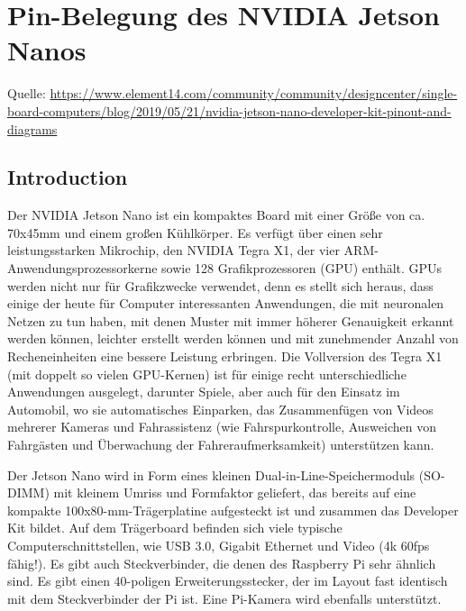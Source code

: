 %
%

\chapter{Pin-Belegung des NVIDIA Jetson Nanos}


{\tiny  Quelle: \url{https://www.element14.com/community/community/designcenter/single-board-computers/blog/2019/05/21/nvidia-jetson-nano-developer-kit-pinout-and-diagrams}}


\section{Introduction}



Der NVIDIA Jetson Nano ist ein kompaktes Board mit einer Größe von ca. 70x45mm und einem großen Kühlkörper. 
Es verfügt über einen sehr leistungsstarken Mikrochip, den NVIDIA Tegra X1, der vier ARM-Anwendungsprozessorkerne sowie 128 Grafikprozessoren (GPU) enthält. GPUs werden nicht nur für Grafikzwecke verwendet, denn es stellt sich heraus, dass einige der heute für Computer interessanten Anwendungen, die mit neuronalen Netzen zu tun haben, mit denen Muster mit immer höherer Genauigkeit erkannt werden können, leichter erstellt werden können und mit zunehmender Anzahl von Recheneinheiten eine bessere Leistung erbringen. Die Vollversion des Tegra X1 (mit doppelt so vielen GPU-Kernen) ist für einige recht unterschiedliche Anwendungen ausgelegt, darunter Spiele, aber auch für den Einsatz im Automobil, wo sie automatisches Einparken, das Zusammenfügen von Videos mehrerer Kameras und Fahrassistenz (wie Fahrspurkontrolle, Ausweichen von Fahrgästen und Überwachung der Fahreraufmerksamkeit) unterstützen kann.

\bigskip



Der Jetson Nano wird in Form eines kleinen Dual-in-Line-Speichermoduls (SO-DIMM) mit kleinem Umriss und Formfaktor geliefert, das bereits auf eine kompakte 100x80-mm-Trägerplatine aufgesteckt ist und zusammen das Developer Kit bildet. Auf dem Trägerboard befinden sich viele typische Computerschnittstellen, wie USB 3.0, Gigabit Ethernet und Video (4k 60fps fähig!). Es gibt auch Steckverbinder, die denen des Raspberry Pi sehr ähnlich sind. Es gibt einen 40-poligen Erweiterungsstecker, der im Layout fast identisch mit dem Steckverbinder der Pi ist. Eine Pi-Kamera wird ebenfalls unterstützt.

